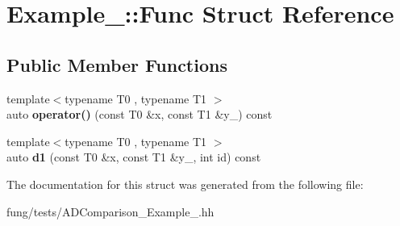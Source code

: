 \hypertarget{structExample__4_1_1Func}{\section{Example\-\_\-:\-:Func Struct Reference}
\label{structExample__4_1_1Func}
}
\subsection*{Public Member Functions}
\begin{DoxyCompactItemize}
\item 
\hypertarget{structExample__4_1_1Func_a3d8e7fcb4794b82a06cc2ce555e2a30f}{{\footnotesize template$<$typename T0 , typename T1 $>$ }\\auto {\bfseries operator()} (const T0 \&x, const T1 \&y\-\_\-) const }\label{structExample__4_1_1Func_a3d8e7fcb4794b82a06cc2ce555e2a30f}

\item 
\hypertarget{structExample__4_1_1Func_ad6f3eada1bd8595855b3fb9985f35359}{{\footnotesize template$<$typename T0 , typename T1 $>$ }\\auto {\bfseries d1} (const T0 \&x, const T1 \&y\-\_\-, int id) const }\label{structExample__4_1_1Func_ad6f3eada1bd8595855b3fb9985f35359}

\end{DoxyCompactItemize}


The documentation for this struct was generated from the following file\-:\begin{DoxyCompactItemize}
\item 
fung/tests/A\-D\-Comparison\-\_\-\-Example\-\_.\-hh\end{DoxyCompactItemize}
